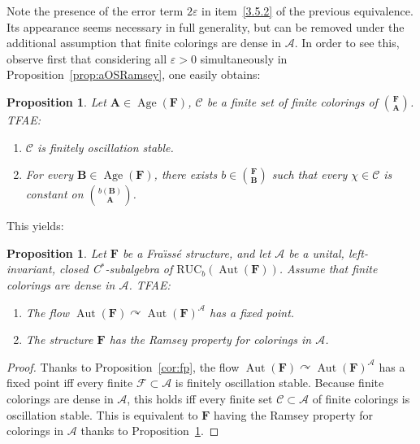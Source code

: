 \documentclass[11pt]{article}
\newtheorem{prop}[theo]{Proposition}
\theoremstyle{definition}
\numberwithin{equation}{section}
\numberwithin{figure}{section}
\numberwithin{table}{section}
\newcommand{\A}{\mathcal A}
\newcommand*{\mA}{\mathbf{A}}
\newcommand*{\mB}{\mathbf{B}}
\newcommand*{\mF}{\mathbf{F}}
\newcommand{\e}{\varepsilon}
\DeclareMathOperator{\Aut}{Aut}
\DeclareMathOperator{\Age}{Age}
\newcommand{\actson}{\curvearrowright}
\newcommand{\RUCB}{\mathrm{RUC}_{b}}
\begin{document}
Note the presence of the error term $2\e$ in item~\eqref{3.5.2} of the previous equivalence. Its appearance seems necessary in full generality, but can be removed under the additional assumption that finite colorings are dense in $\A$. In order to see this, observe first that considering all $\e>0$ simultaneously in Proposition~\ref{prop:aOSRamsey}, one easily obtains:

\begin{prop}\label{prop:OSRamsey}
Let $\mA \in \Age(\mF)$, $\mathcal C$ be a finite set of finite colorings of $\binom{\mF}{\mA}$. TFAE:
\begin{enumerate}
\item $\mathcal C$ is finitely oscillation stable.
\item For every $\mB \in \Age(\mF)$, there exists $b\in \binom{\mF}{\mB}$ such that every $\chi\in \mathcal C$ is constant on $\binom{b(\mB)}{\mA}$.
\end{enumerate}
\end{prop}

This yields:

\begin{prop}\label{cor:fpRP}
Let $\mF$ be a Fra\"{\i}ss\'e structure, and let $\A$ be a unital, left-invariant, closed C$^{*}$-subalgebra of $\RUCB(\Aut(\mF))$. Assume that finite colorings are dense in $\A$. TFAE:
\begin{enumerate}
\item \label{3.7.1} The flow $\Aut(\mF)\actson \Aut(\mF)^{\A}$ has a fixed point.
\item \label{3.7.2} The structure $\mF$ has the Ramsey property for colorings in $\A$.
\end{enumerate}
\end{prop}

\begin{proof}
Thanks to Proposition~\ref{cor:fp}, the flow $\Aut(\mF)\actson \Aut(\mF)^{\A}$ has a fixed point iff every finite $\mathcal F\subset \A$ is finitely oscillation stable. Because finite colorings are dense in $\A$, this holds iff every finite set $\mathcal C \subset \A$ of finite colorings is oscillation stable. This is equivalent to $\mF$ having the Ramsey property for colorings in $\A$ thanks to Proposition~\ref{prop:OSRamsey}.
\end{proof}
\end{document}
